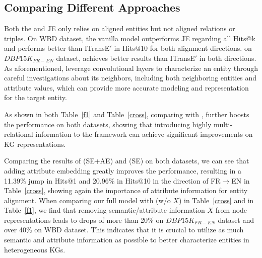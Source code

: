 \subsection{Comparing Different Approaches\label{sec:analysis}}




 Both the \GCN and JE only relies on aligned entities but not aligned relations or triples.  On WBD
dataset, the vanilla \GCN model outperforms JE regarding all Hits@k and performs better than ITransE$'$ in Hits@10 for both alignment
directions. on $DBP15K_{FR-EN}$ dataset, \GCN achieves better results than ITransE$'$ in both directions. As aforementioned, \GCNs leverage
convolutional layers to characterize an entity through careful investigations about its neighbors, including both neighboring entities and
attribute values, which can provide more accurate modeling and representation for the target entity.

 As shown in both Table~\ref{f1} and Table~\ref{cross}, comparing with \GCN, \RGCN further boosts the
performance on both datasets, showing that introducing highly multi-relational information to the \GCN framework can achieve significant
improvements on KG representations.


Comparing the results of \HRGCN (SE+AE) and \HRGCN (SE) on both datasets, we can see that adding attribute embedding greatly improves the performance, resulting in a 11.39\% jump in Hits@1 and 20.96\% in Hits@10 in the direction of FR$\rightarrow$EN in Table~\ref{cross}, showing again the importance of attribute information for entity alignment.
When comparing our full model \HRGCN with \HRGCN (w/o $X$) in Table~\ref{cross} and in Table~\ref{f1}, we find that removing semantic/attribute information $X$ from node representations leads to drops of more than 20\% on $DBP15K_{FR-EN}$ dataset and over 40\% on WBD dataset. This indicates that it is crucial to utilize
as much semantic and attribute information as possible to better characterize entities in heterogeneous KGs.


